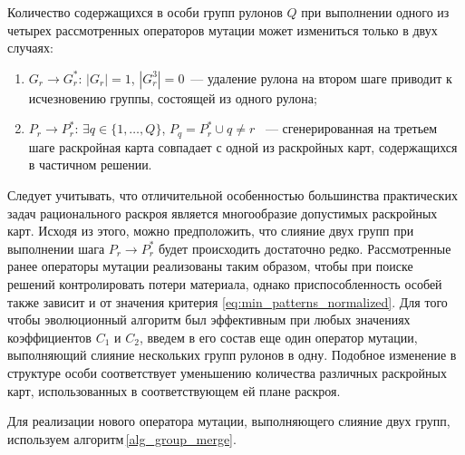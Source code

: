 \documentclass[12pt]{article}
\begin{document}
Количество содержащихся в особи групп рулонов $Q$ при выполнении одного из 
четырех рассмотренных операторов мутации может измениться только в двух 
случаях:
\begin{enumerate}
    \item $G_r \rightarrow G_r^*$: $|G_r|=1$, $|G_r^3|=0$~--- удаление рулона 
    на втором шаге приводит к исчезновению группы, состоящей из одного рулона;
    \item $P_r \rightarrow P_r^*$: $\exists q \in \{1,\ldots,Q\}$, $P_q=P_r^* \cup q \neq r$
    ~--- сгенерированная на третьем шаге раскройная карта совпадает с одной из 
    раскройных карт, содержащихся в частичном решении.
\end{enumerate}

Следует учитывать, что отличительной особенностью большинства практических 
задач рационального раскроя является многообразие допустимых раскройных карт. 
Исходя из этого, можно предположить, что слияние двух групп при выполнении 
шага $P_r \rightarrow P_r^*$ будет происходить достаточно редко. Рассмотренные 
ранее операторы мутации реализованы таким образом, чтобы при поиске решений 
контролировать потери материала, однако приспособленность особей также зависит 
и от значения критерия 
\eqref{eq:min_patterns_normalized}. 
Для того чтобы эволюционный алгоритм был 
эффективным при любых значениях коэффициентов $C_1$ и $C_2$, введем в его 
состав еще один оператор мутации, выполняющий слияние нескольких групп рулонов 
в одну. Подобное изменение в структуре особи соответствует уменьшению 
количества различных раскройных карт, использованных в соответствующем ей 
плане раскроя.

Для реализации нового оператора мутации, выполняющего слияние двух групп, 
используем алгоритм\,\ref{alg_group_merge}.
\end{document}
